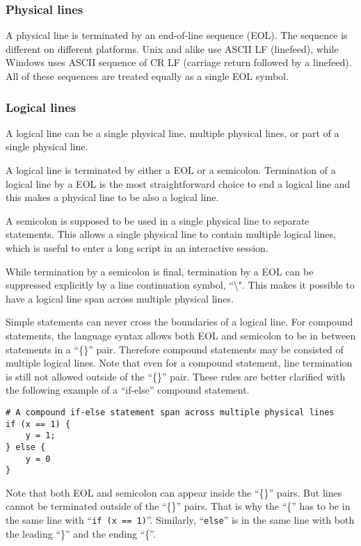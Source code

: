 \documentclass[10pt,a4paper]{article}
\begin{document}
\subsubsection{Physical lines}
A physical line is terminated by an end-of-line sequence (EOL). The
sequence is different on different platforms. Unix and alike use ASCII LF
(linefeed), while Windows uses ASCII sequence of CR LF (carriage return followed
by a linefeed). All of these sequences are treated equally as a single 
EOL symbol.

\subsubsection{Logical lines}
A logical line can be a single physical line, multiple physical lines, or
part of a single physical line.

A logical line is terminated by either a EOL or a semicolon.
Termination of a logical line by a EOL is the most 
straightforward choice to end a logical line and this makes a physical 
line to be also a logical line.

A semicolon is supposed to be used in a single physical line to separate 
statements. This allows a single physical line to contain multiple logical
lines, which is useful to enter a long script in an interactive session.

While termination by a semicolon is final, termination by a EOL can be 
suppressed explicitly by a line continuation symbol, ``\textbackslash".
This makes it possible to have a logical line span across multiple 
physical lines. 

Simple statements can never cross the boundaries of a logical line.
For compound statements, the language syntax allows both EOL and semicolon
to be in between statements in a ``\{\}'' pair. Therefore compound statements
may be consisted of multiple logical lines. Note that even for a compound 
statement, line termination is still not allowed outside of the 
``\{\}'' pair. 
These rules are better clarified with the following example of a ``if-else''
compound statement. 

\begin{lstlisting}
# A compound if-else statement span across multiple physical lines
if (x == 1) {
    y = 1;
} else {
    y = 0
}
\end{lstlisting}

Note that both EOL and semicolon can appear inside the ``\{\}'' pairs. 
But lines cannot be terminated outside of the ``\{\}'' pairs. That is
why the ``\{'' has to be in the same line with ``\lstinline$if (x == 1)$''.
Similarly, ``\lstinline$else$'' is in the same line with both the leading
``\}'' and the ending ``\{''.
\end{document}
